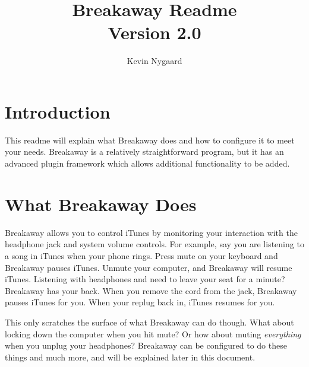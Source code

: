\documentclass[12pt]{article}
\title{Breakaway Readme\\ Version 2.0}
\author{Kevin Nygaard}
\begin{document}
\maketitle
\clearpage
\section{Introduction}
This readme will explain what Breakaway does and how to configure it to meet your needs. Breakaway is a relatively straightforward program, but it has an advanced plugin framework which allows additional functionality to be added. 

\section{What Breakaway Does}
Breakaway allows you to control iTunes by monitoring your interaction with the headphone jack and system volume controls.  For example, say you are listening to a song in iTunes when your phone rings. Press mute on your keyboard and Breakaway pauses iTunes. Unmute your computer, and Breakaway will resume iTunes. Listening with headphones and need to leave your seat for a minute? Breakaway has your back. When you remove the cord from the jack, Breakaway pauses iTunes for you. When your replug back in, iTunes resumes for you.

This only scratches the surface of what Breakaway can do though. What about locking down the computer when you hit mute? Or how about muting {\em everything} when you unplug your headphones? Breakaway can be configured to do these things and much more, and will be explained later in this document.
\end{document}
